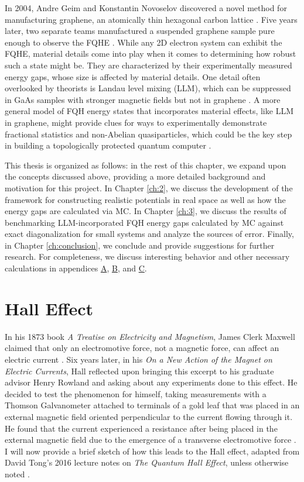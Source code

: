 In 2004, Andre Geim and Konstantin Novoselov discovered a novel method for manufacturing graphene, an atomically thin hexagonal carbon lattice \cite{novoselov}. Five years later, two separate teams manufactured a suspended graphene sample pure enough to observe the FQHE \cite{du,bolotin}. While any 2D electron system can exhibit the FQHE, material details come into play when it comes to determining how robust such a state might be. They are characterized by their experimentally measured energy gaps, whose size is affected by material details. One detail often overlooked by theorists is Landau level mixing (LLM), which can be suppressed in GaAs samples with stronger magnetic fields but not in graphene \cite{peterson}. A more general model of FQH energy states that incorporates material effects, like LLM in graphene, might provide clues for ways to experimentally demonstrate fractional statistics and non-Abelian quasiparticles, which could be the key step in building a topologically protected quantum computer \cite{nayak}.

This thesis is organized as follows: in the rest of this chapter, we expand upon the concepts discussed above, providing a more detailed background and motivation for this project. In Chapter \ref{ch:2}, we discuss the development of the framework for constructing realistic potentials in real space as well as how the energy gaps are calculated via MC. In Chapter \ref{ch:3}, we discuss the results of benchmarking LLM-incorporated FQH energy gaps calculated by MC against exact diagonalization for small systems and analyze the sources of error. Finally, in Chapter \ref{ch:conclusion}, we conclude and provide suggestions for further research. For completeness, we discuss interesting behavior and other necessary calculations in appendices \hyperref[appendixA]{A}, \hyperref[appendixB]{B}, and \hyperref[appendixC]{C}.

  
\section{Hall Effect}\label{sec:classHallEff}
    In his 1873 book \textit{A Treatise on Electricity and Magnetism}, James Clerk Maxwell claimed that only an electromotive force, not a magnetic force, can affect an electric current \cite{maxwell}. Six years later, in his \textit{On a New Action of the Magnet on Electric Currents}, Hall reflected upon bringing this excerpt to his graduate advisor Henry Rowland and asking about any experiments done to this effect. He decided to test the phenomenon for himself, taking measurements with a Thomson Galvanometer attached to terminals of a gold leaf that was placed in an external magnetic field oriented perpendicular to the current flowing through it. He found that the current experienced a resistance after being placed in the external magnetic field due to the emergence of a transverse electromotive force \cite{hall}. I will now provide a brief sketch of how this leads to the Hall effect, adapted from David Tong's 2016 lecture notes on \textit{The Quantum Hall Effect}, unless otherwise noted \cite{tong}. 
    
